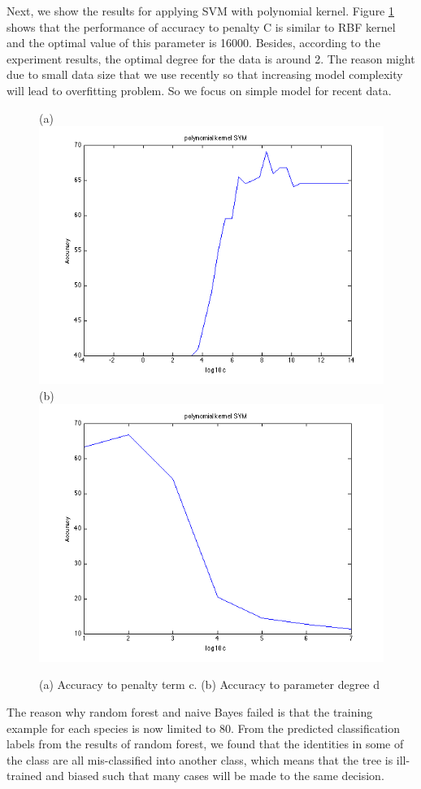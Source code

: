 \documentclass{article} %
\begin{document}
Next, we show the results for applying SVM with polynomial kernel. Figure \ref{fig:poly} shows that the performance of accuracy to penalty C is similar to RBF kernel and the optimal value of this parameter is 16000. Besides, according to the experiment results, the optimal degree for the data is around 2. The reason might due to small data size that we use recently so that increasing model complexity will lead to overfitting problem. So we focus on simple model for recent data.  
 
\begin{figure}[ht!]
    \centering
    {(a)\includegraphics[width=0.38\linewidth]{../Figure/Poly_cost_accuracy}
    (b)\includegraphics[width=0.38\linewidth]{../Figure/Poly_degree_accuracy}}
    \caption{(a) Accuracy to penalty term c. (b) Accuracy to parameter degree d}
    \label{fig:poly}
\end{figure}

The reason why random forest and naive Bayes failed is that the training example for each species is now limited to 80. From the predicted classification labels from the results of random forest, we found that the identities in some of the class are all mis-classified into another class, which means that the tree is ill-trained and biased such that many cases will be made to the same decision. 



\end{document}
